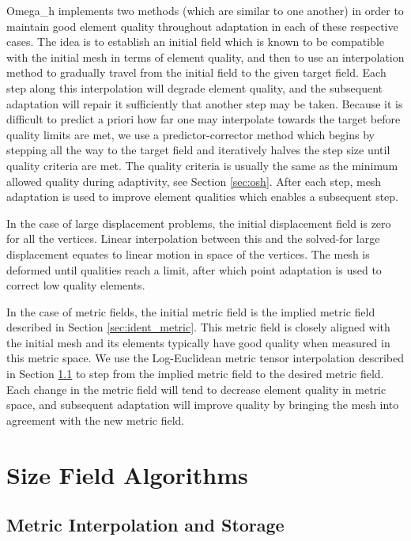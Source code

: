 Omega\_h implements two methods (which are similar to one another)
in order to maintain good element
quality throughout adaptation in each of these respective cases.
The idea is to establish an initial field which is known to be
compatible with the initial mesh in terms of element quality,
and then to use an interpolation method to gradually travel
from the initial field to the given target field.
Each step along this interpolation will degrade element quality,
and the subsequent adaptation will repair it sufficiently
that another step may be taken.
Because it is difficult to predict a priori how far one may
interpolate towards the target before quality limits are met,
we use a predictor-corrector method which begins by stepping
all the way to the target field and iteratively halves the
step size until quality criteria are met.
The quality criteria is usually the same as the minimum
allowed quality during adaptivity, see Section \ref{sec:osh}.
After each step, mesh adaptation is used to improve element
qualities which enables a subsequent step.

In the case of large displacement problems, the initial displacement field
is zero for all the vertices.
Linear interpolation between this and the solved-for large displacement
equates to linear motion in space of the vertices.
The mesh is deformed until qualities reach a limit, after which
point adaptation is used to correct low quality elements.

In the case of metric fields, the initial metric field
is the implied metric field described in Section \ref{sec:ident_metric}.
This metric field is closely aligned with the initial mesh
and its elements typically have good quality when measured in
this metric space.
We use the Log-Euclidean metric tensor interpolation described
in Section \ref{sec:metric_interp} to step from the implied
metric field to the desired metric field.
Each change in the metric field will tend to decrease element
quality in metric space, and subsequent adaptation will
improve quality by bringing the mesh into agreement with
the new metric field.

\section{Size Field Algorithms}
\label{sec:sf}

\subsection{Metric Interpolation and Storage}
\label{sec:metric_interp}

